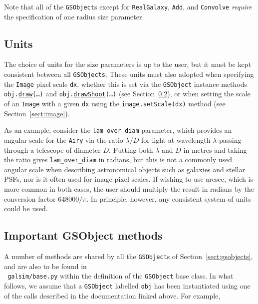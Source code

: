 \documentclass[preprint,11pt]{../../devel/modules/aastex}
\begin{document}
Note that all of the \texttt{GSObject}s except for \texttt{RealGalaxy}, \texttt{Add}, and
\texttt{Convolve} {\em require} the specification of one radius size
parameter. 

\subsection{Units}
The choice of units for the size parameters is up to the user,
but it must be kept consistent between all \texttt{GSObjects}.  These
units must also adopted when specifying the \texttt{Image} pixel
scale \texttt{dx}, whether this is set via the \texttt{GSObject}
instance methods \texttt{obj.}\href{http://galsim-developers.github.com/GalSim/classgalsim_1_1base_1_1_g_s_object.html#ae0b346a8b438dedbc7f60a52220869d8}{\texttt{draw}}\texttt{(\dots)}
and
\texttt{obj.}\href{http://galsim-developers.github.com/GalSim/classgalsim_1_1base_1_1_g_s_object.html#a42ac334d2840ba3fa832988e998beca0}{\texttt{drawShoot}}\texttt{(\dots)}
(see Section~\ref{sect:gsobjectmethods}),
or when setting the scale of an \texttt{Image} with a given
\texttt{dx} using the \texttt{image.setScale(dx)} method (see Section~\ref{sect:image}).

As an example, consider the
\texttt{lam\_over\_diam} parameter, which provides an angular scale for
the \texttt{Airy} via
the ratio $\lambda / D$ for light at wavelength $\lambda$ passing
through a telescope of diameter $D$. Putting both $\lambda$ and
$D$ in metres and taking the ratio gives \texttt{lam\_over\_diam} in
radians, but this is not a commonly used angular scale when describing
astronomical objects such as galaxies and stellar PSFs, nor is
it often used for image pixel scales.  If wishing to use arcsec, which
is more common in both cases, the user should multiply the result in
radians by the conversion factor
$648000 / \pi$.  In principle, however, any consistent
system of units could be used.


\subsection{Important GSObject methods}\label{sect:gsobjectmethods}
A number of methods are shared by all the \texttt{GSObject}s of
Section~\ref{sect:gsobjects}, and are also to be found in \\ {\tt
 galsim/base.py} within the definition of the
\texttt{GSObject} base class.  In what follows, we assume that a
\texttt{GSObject} labelled \texttt{obj} has been instantiated using
one of the calls described in the documentation linked above.  For
example,
\end{document}

